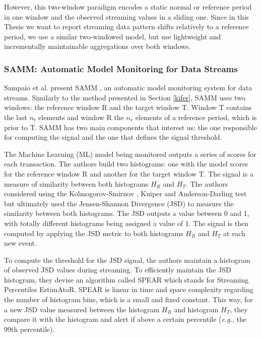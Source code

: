However, this two-window paradigm encodes a static normal or reference period in one window and the observed streaming values in a sliding one. Since in this Thesis we want to report streaming data pattern shifts relatively to a reference period, we use a similar two-windowed model, but use lightweight and incrementally maintainable aggregations over both windows.


\subsubsection{SAMM: Automatic Model Monitoring for Data Streams}

Sampaio et al. present SAMM \cite{SAMM}, an automatic model monitoring system for data streams. Similarly to the method presented in Section \ref{kifer}, SAMM uses two windows: the reference window R and the target window T. Window T contains the last $n_t$ elements and window R the $n_r$ elements of a reference period, which is prior to T. SAMM has two main components that interest us: the one responsible for computing the signal and the one that defines the signal threshold. 

The Machine Learning (ML) model being monitored outputs a series of scores for each transaction. The authors build two histograms: one with the model scores for the reference window R and another for the target window T. The signal is a measure of similarity between both histograms $H_R$ and $H_T$. The authors considered using the Kolmogorov-Smirnov \cite{KolomogorovSmirnov, Kolmogorov-Smirnov}, Kuiper \cite{KuiperTest} and Anderson-Darling \cite{AndersonDarling} test but ultimately used the Jensen-Shannon Divergence (JSD) \cite{JSD} to measure the similarity between both histograms. The JSD outputs a value between 0 and 1, with totally different histograms being assigned a value of 1. The signal is then computed by applying the JSD metric to both histograms $H_R$ and $H_T$ at each new event.

To compute the threshold for the JSD signal, the authors maintain a histogram of observed JSD values during streaming. To efficiently maintain the JSD histogram, they devise an algorithm called SPEAR which stands for Streaming Percentiles EstimAtoR. SPEAR is linear in time and space complexity regarding the number of histogram bins, which is a small and fixed constant. This way, for a new JSD value measured between the histogram $H_R$ and histogram $H_T$, they compare it with the histogram and alert if above a certain percentile (\textit{e.g.}, the 99th percentile).

